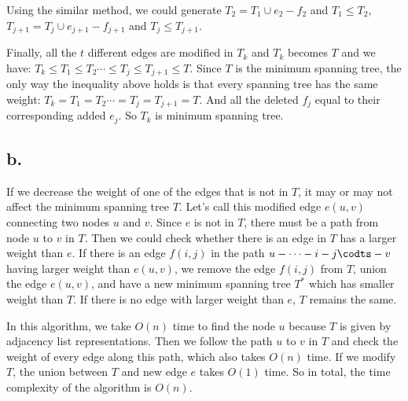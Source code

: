 \documentclass[twoside,11pt]{homework}
\begin{document}
Using the similar method, we could generate $T_2 = T_1 \cup e_2 - f_2$ and $T_1 \le T_2$,  $T_{j+1} = T_j \cup e_{j+1} - f_{j+1}$ and $T_j \le T_{j+1}$.

Finally, all the $t$ different edges are modified in $T_k$ and $T_k$ becomes $T$ and we have:
$T_k \le T_1 \le T_2 \cdots \le T_j \le T_{j+1} \le T$.
Since $T$ is the minimum spanning tree, the only way the inequality above holds is that every spanning tree has the same weight: $T_k = T_1 = T_2 \cdots = T_j = T_{j+1} = T$.
And all the deleted $f_j$ equal to their corresponding added $e_j$.
So $T_k$ is minimum spanning tree.



\subsection*{b.}
If we decrease the weight of one of the edges that is not in $T$, it may or may not affect the minimum spanning tree $T$.
Let's call this modified edge $e(u, v)$ connecting two nodes $u$ and $v$.
Since $e$ is not in $T$, there must be a path from node $u$ to $v$ in $T$.
Then we could check whether there is an edge in $T$ has a larger weight than $e$.
If there is an edge $f(i, j)$ in the path $u - \cdots - i - j \codts -v$ having larger weight than $e(u, v)$, we remove the edge $f(i, j)$ from $T$, union the edge $e(u, v)$, and have a new minimum spanning tree $T^*$ which has smaller weight than $T$.
If there is no edge with larger weight than $e$, $T$ remains the same.

In this algorithm, we take $O(n)$ time to find the node $u$ because $T$ is given by adjacency list representations.
Then we follow the path $u$ to $v$ in $T$ and check the weight of every edge along this path, which also takes $O(n)$ time.
If we modify $T$, the union between $T$ and new edge $e$ takes $O(1)$ time.
So in total, the time complexity of the algorithm is $O(n)$.
\end{document}
